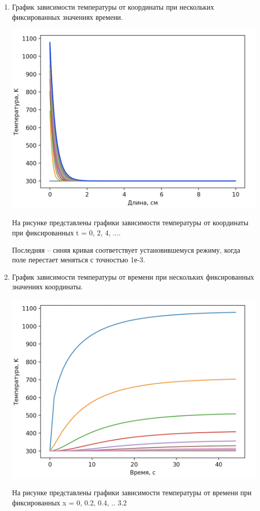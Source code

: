 \documentclass[a4paper,14pt]{extreport} %
\begin{document}
\begin{enumerate}
\item График зависимости температуры от координаты при нескольких фиксированных значениях времени.

\includegraphics[scale=0.85]{1}

На рисунке представлены графики зависимости температуры от координаты при фиксированных t = 0, 2, 4, .... 

Последняя -- синяя кривая соответствует установившемуся режиму, когда поле перестает меняться с точностью 1е-3. 

\item График зависимости температуры от времени при нескольких фиксированных значениях координаты. 

\includegraphics[scale=0.85]{2}

На рисунке представлены графики зависимости температуры от времени при фиксированных x = 0, 0.2, 0.4, .. 3.2

\end{enumerate}
\end{document}
